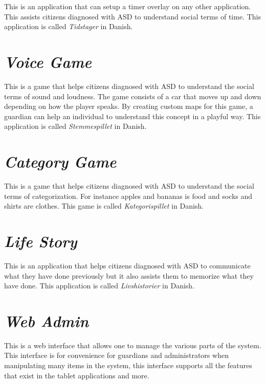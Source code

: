 This is an application that can setup a timer overlay on any other application. This assists citizens diagnosed with ASD to understand social terms of time. This application is called \emph{Tidstager} in Danish.

\section{\emph{Voice Game}}
\label{sec:app_voice_game}

This is a game that helps citizens diagnosed with ASD to understand the social terms of sound and loudness. The game consists of a car that moves up and down depending on how the player speaks. By creating custom maps for this game, a guardian can help an individual to understand this concept in a playful way. This application is called \emph{Stemmespillet} in Danish.

\section{\emph{Category Game}}
\label{sec:app_category_game}

This is a game that helps citizens diagnosed with ASD to understand the social terms of categorization. For instance apples and bananas is food and socks and shirts are clothes. This game is called \emph{Kategorispillet} in Danish.

\section{\emph{Life Story}}
\label{sec:app_life_story}

This is an application that helps citizens diagnosed with ASD to communicate what they have done previously but it also assists them to memorize what they have done. This application is called \emph{Livshistorier} in Danish.

\section{\emph{Web Admin}}
\label{sec:app_web_admin}

This is a web interface that allows one to manage the various parts of the \giraf system. This interface is for convenience for guardians and administrators when manipulating many items in the system, this interface supports all the features that exist in the tablet applications and more.